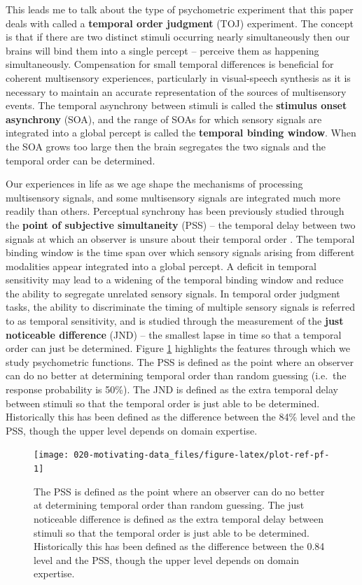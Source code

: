 \documentclass[11pt, oneside, openany]{scrbook}
\begin{document}
This leads me to talk about the type of psychometric experiment that this paper deals with called a \textbf{temporal order judgment} (TOJ) experiment. The concept is that if there are two distinct stimuli occurring nearly simultaneously then our brains will bind them into a single percept -- perceive them as happening simultaneously. Compensation for small temporal differences is beneficial for coherent multisensory experiences, particularly in visual-speech synthesis as it is necessary to maintain an accurate representation of the sources of multisensory events. The temporal asynchrony between stimuli is called the \textbf{stimulus onset asynchrony} (SOA), and the range of SOAs for which sensory signals are integrated into a global percept is called the \textbf{temporal binding window}. When the SOA grows too large then the brain segregates the two signals and the temporal order can be determined.

Our experiences in life as we age shape the mechanisms of processing multisensory signals, and some multisensory signals are integrated much more readily than others. Perceptual synchrony has been previously studied through the \textbf{point of subjective simultaneity} (PSS) -- the temporal delay between two signals at which an observer is unsure about their temporal order \citep{stone2001now}. The temporal binding window is the time span over which sensory signals arising from different modalities appear integrated into a global percept. A deficit in temporal sensitivity may lead to a widening of the temporal binding window and reduce the ability to segregate unrelated sensory signals. In temporal order judgment tasks, the ability to discriminate the timing of multiple sensory signals is referred to as temporal sensitivity, and is studied through the measurement of the \textbf{just noticeable difference} (JND) -- the smallest lapse in time so that a temporal order can just be determined. Figure \ref{fig:plot-ref-pf} highlights the features through which we study psychometric functions. The PSS is defined as the point where an observer can do no better at determining temporal order than random guessing (i.e.~the response probability is 50\%). The JND is defined as the extra temporal delay between stimuli so that the temporal order is just able to be determined. Historically this has been defined as the difference between the 84\% level and the PSS, though the upper level depends on domain expertise.

\begin{figure}

{\centering \texttt{[image: 020-motivating-data\_files/figure-latex/plot-ref-pf-1]} 

}

\caption{The PSS is defined as the point where an observer can do no better at determining temporal order than random guessing. The just noticeable difference is defined as the extra temporal delay between stimuli so that the temporal order is just able to be determined. Historically this has been defined as the difference between the 0.84 level and the PSS, though the upper level depends on domain expertise.}\label{fig:plot-ref-pf}
\end{figure}
\end{document}
